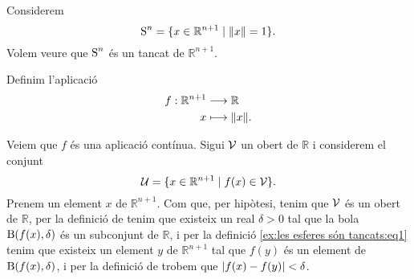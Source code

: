 \documentclass[../Apunts.tex]{subfiles}
\begin{document}
	\begin{example}
		\label{ex:les esferes són tancats}
		Considerem
		\[\esfera^{n}=\{x\in\mathbb{R}^{n+1}\mid\norm{x}=1\}.\]
		Volem veure que \(\operatorname{S}^{n}\) és un tancat de \(\mathbb{R}^{n+1}\).
		\begin{solution}
			Definim l'aplicació
			\begin{align*}
				f:\mathbb{R}^{n+1}&\longrightarrow\mathbb{R} \\
				x&\longmapsto\norm{x}.
			\end{align*}
			\begin{comment}
				Veiem que \(f\) és una aplicació tancada. Sigui \(\tancat{C}\) un tancat de \(\mathbb{R}^{n+1}\) i considerem el conjunt
				\[\tancat{K}=\{f(x)\in\mathbb{R}\mid x\in\tancat{C}\}.\]
				Tenim que \(\tancat{K}\) és un tancat de \(\mathbb{R}\), ja que si \(y\) és un element de \(\tancat{K}\), aleshores \(y\neq f(x)\) per a tot \(x\) de \(\obert{C}\), i per tant existeix un real \(d>0\) tal que
				\[d=\min_{x\in\tancat{C}}\abs{f(x)-y},\]
				i per tant tenim que per a tot \(y\) de \(\mathbb{R}\setminus\tancat{K}\) existeix una bola \(\bola(y,d)\) tal que \(\bola(y,d)\cap\tancat{K}=\emptyset\), i per la definició d'\myref{def:obert espai mètric} trobem que \(\mathbb{R}\setminus\tancat{K}\) és un obert de \(\mathbb{R}\). Aleshores per la definició de \myref{def:tancat} trobem que \(\tancat{K}\) és un tancat, i per la definició de \myref{def:aplicació tancada} trobem que \(f\) és una aplicació tancada.
				
				Ara bé, tenim que \(\{1\}\) és un tancat de \(\mathbb{R}\)
			\end{comment}
			Veiem que \(f\) és una aplicació contínua. Sigui \(\mathcal{V}\) un obert de \(\mathbb{R}\) i considerem el conjunt
			\begin{equation}
				\label{ex:les esferes són tancats:eq1}
				\mathcal{U}=\{x\in\mathbb{R}^{n+1}\mid f(x)\in\mathcal{V}\}.
			\end{equation}
			Prenem un element \(x\) de \(\mathbb{R}^{n+1}\). Com que, per hipòtesi, tenim que \(\mathcal{V}\) és un obert de \(\mathbb{R}\), per la definició de  tenim que existeix un real \(\delta>0\) tal que la bola \(\operatorname{B}(f(x),\delta)\) és un subconjunt de \(\mathbb{R}\), i per la definició \eqref{ex:les esferes són tancats:eq1} tenim que existeix un element \(y\) de \(\mathbb{R}^{n+1}\) tal que \(f(y)\) és un element de \(\operatorname{B}(f(x),\delta)\), i per la definició de  trobem que \(\abs{f(x)-f(y)}<\delta\).
		\end{solution}
	\end{example}
\end{document}
